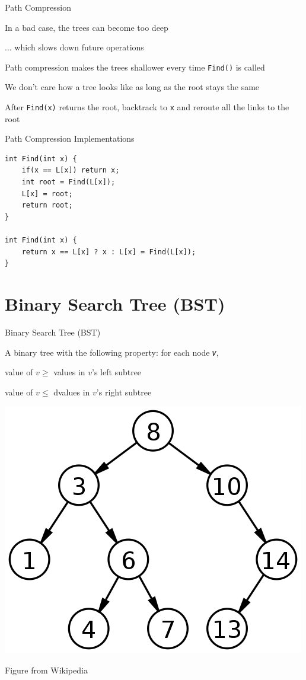 \documentclass[13pt,onlymath]{beamer}
\begin{document}
\begin{frame}[fragile]{Path Compression}
\BIT
\item In a bad case, the trees can become too deep
\BIT
\item ... which slows down future operations
\EIT
\item Path compression makes the trees shallower every time \verb,Find(), is called
\item We don't care how a tree looks like as long as the root stays the same
\BIT
\item After \verb,Find(x), returns the root, backtrack to \verb,x, and reroute all the links to the root
\EIT
\EIT
\end{frame}

\begin{frame}[fragile]{Path Compression Implementations}
\begin{Verbatim}[xleftmargin=25pt]
int Find(int x) {
    if(x == L[x]) return x;
    int root = Find(L[x]);
    L[x] = root;
    return root;
}

int Find(int x) {
    return x == L[x] ? x : L[x] = Find(L[x]);
}
\end{Verbatim}
\end{frame}


\section{Binary Search Tree (BST)}

\begin{frame}[fragile]{Binary Search Tree (BST)}
\BIT
\item A binary tree with the following property: for each node 𝑣,
\BIT
\item value of $v \ge $ values in $v$'s left subtree
\item value of $v \le $ dvalues in $v$'s right subtree
\EIT
\EIT
\begin{center}
\includegraphics[height=0.4\textheight]{figures/bst}

Figure from Wikipedia
\end{center}
\end{frame}
\end{document}
